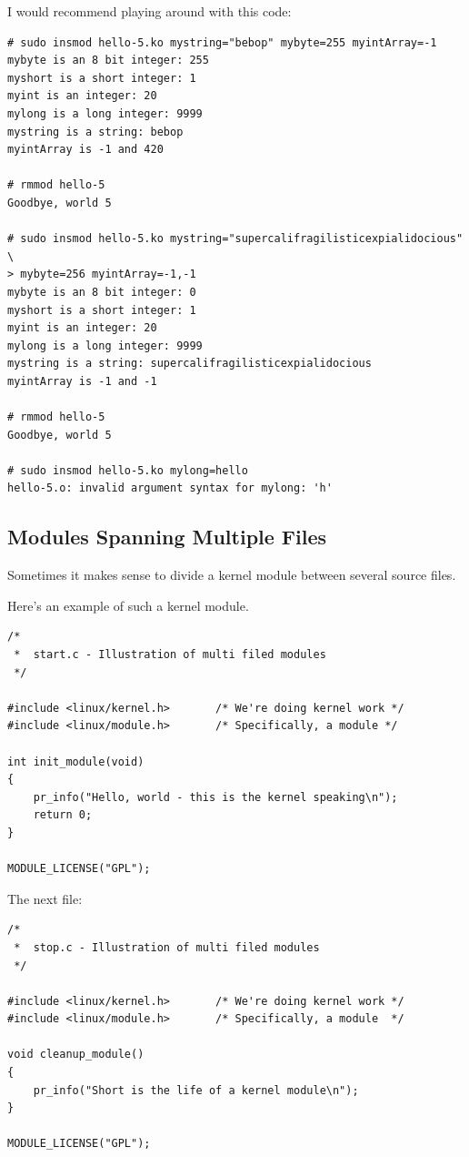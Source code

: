 \documentclass[11pt]{article}
\begin{document}
I would recommend playing around with this code:

\begin{verbatim}
# sudo insmod hello-5.ko mystring="bebop" mybyte=255 myintArray=-1
mybyte is an 8 bit integer: 255
myshort is a short integer: 1
myint is an integer: 20
mylong is a long integer: 9999
mystring is a string: bebop
myintArray is -1 and 420

# rmmod hello-5
Goodbye, world 5

# sudo insmod hello-5.ko mystring="supercalifragilisticexpialidocious" \
> mybyte=256 myintArray=-1,-1
mybyte is an 8 bit integer: 0
myshort is a short integer: 1
myint is an integer: 20
mylong is a long integer: 9999
mystring is a string: supercalifragilisticexpialidocious
myintArray is -1 and -1

# rmmod hello-5
Goodbye, world 5

# sudo insmod hello-5.ko mylong=hello
hello-5.o: invalid argument syntax for mylong: 'h'
\end{verbatim}

\subsection*{Modules Spanning Multiple Files}
\label{sec-4-6}
Sometimes it makes sense to divide a kernel module between several source files.

Here's an example of such a kernel module.

\begin{verbatim}
/*
 *  start.c - Illustration of multi filed modules
 */

#include <linux/kernel.h>       /* We're doing kernel work */
#include <linux/module.h>       /* Specifically, a module */

int init_module(void)
{
    pr_info("Hello, world - this is the kernel speaking\n");
    return 0;
}

MODULE_LICENSE("GPL");
\end{verbatim}

The next file:

\begin{verbatim}
/*
 *  stop.c - Illustration of multi filed modules
 */

#include <linux/kernel.h>       /* We're doing kernel work */
#include <linux/module.h>       /* Specifically, a module  */

void cleanup_module()
{
    pr_info("Short is the life of a kernel module\n");
}

MODULE_LICENSE("GPL");
\end{verbatim}
\end{document}
